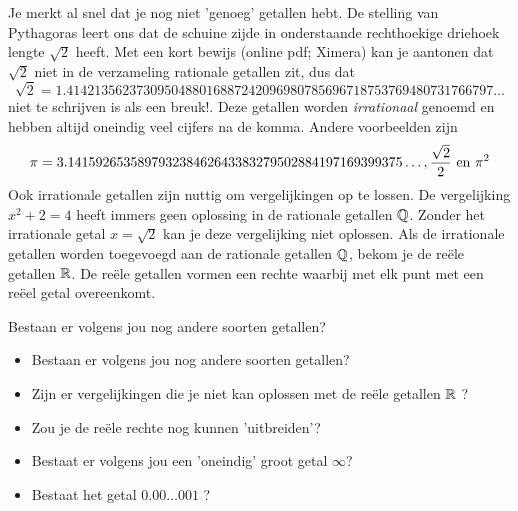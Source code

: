 \documentclass{ximera}
\begin{document}
Je merkt al snel dat je nog niet 'genoeg' getallen hebt. 
De stelling van Pythagoras 
leert ons dat de schuine zijde in onderstaande rechthoekige driehoek lengte \( \sqrt{2}\) heeft. 
Met een kort bewijs (online pdf; Ximera) kan je aantonen dat \(\sqrt{2}\) niet in de verzameling rationale getallen zit, dus dat 
\[\sqrt{2} = 1.4142135623730950488016887242096980785696718753769480731766797\ldots%
\]  
niet te schrijven is als een breuk!. 
Deze getallen worden \textit{irrationaal} genoemd en hebben altijd oneindig veel cijfers na de komma.
%
Andere voorbeelden zijn 
\[ \pi = 3.141592653589793238462643383279502884197169399375\ldots%
,
\frac{\sqrt{2}}{2}
\Ten \pi^2 
\]
%
Ook irrationale getallen zijn nuttig om vergelijkingen op te lossen. 
De vergelijking \(x^2 + 2 = 4\) heeft immers geen oplossing in de rationale getallen \( \mathbb{Q} \).
Zonder het irrationale getal \(x = \sqrt{2} \) kan je deze vergelijking niet oplossen.
Als de irrationale getallen worden toegevoegd aan de rationale getallen \(\mathbb{Q}\), bekom je de reële getallen \(\mathbb{R}\). 
De reële getallen vormen een rechte waarbij met elk punt met een reëel getal overeenkomt. 

\begin{denkvraag*}{} 
    
    Bestaan er volgens jou nog andere soorten getallen? 
\begin{itemize}
    \item Bestaan er volgens jou nog andere soorten getallen? 
    \item Zijn er vergelijkingen die je niet kan oplossen met de reële getallen \( \mathbb{R} \) ?
    \item Zou je de reële rechte nog kunnen 'uitbreiden'? 
    \item Bestaat er volgens jou een 'oneindig' groot getal \( \infty \)? 
    \item Bestaat het getal \(0.00\dots001 \) ? 
    
\end{itemize}
\end{denkvraag*}
\end{document}
